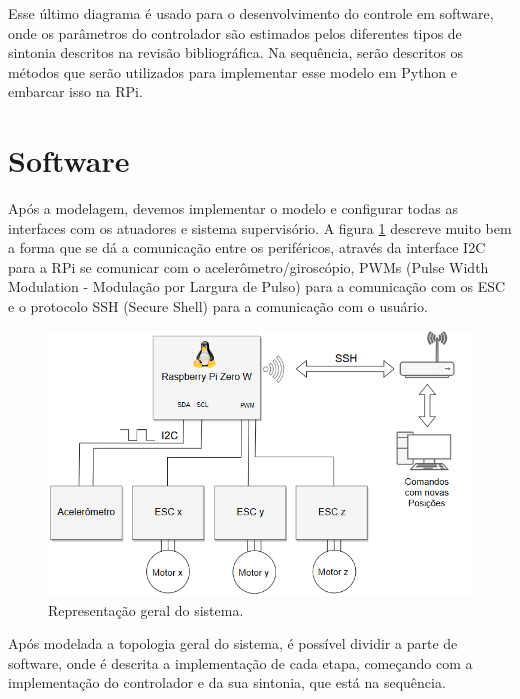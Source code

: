 Esse último diagrama é usado para o desenvolvimento do controle em software, onde os parâmetros do controlador são estimados pelos diferentes tipos de sintonia descritos na revisão bibliográfica. Na sequência, serão descritos os métodos que serão utilizados para implementar esse modelo em Python e embarcar isso na RPi.



\section{Software}

Após a modelagem, devemos implementar o modelo e configurar todas as interfaces com os atuadores e sistema supervisório. A figura \ref{fig:comunicacao_projeto} descreve muito bem a forma que se dá a comunicação entre os periféricos, através da interface I2C para a RPi se comunicar com o acelerômetro/giroscópio, PWMs (Pulse Width Modulation - Modulação por Largura de Pulso) para a comunicação com os ESC e o protocolo SSH (Secure Shell) para a comunicação com o usuário.

\begin{figure}[H]
  \caption{Representação geral do sistema.}
  \begin{center}
      \includegraphics[scale=.65]{metodologia/img/comunicacao_projeto}
  \end{center}
  \label{fig:comunicacao_projeto}
\end{figure}


Após modelada a topologia geral do sistema, é possível dividir a parte de software, onde é descrita a implementação de cada etapa, começando com a implementação do controlador e da sua sintonia, que está na sequência.


